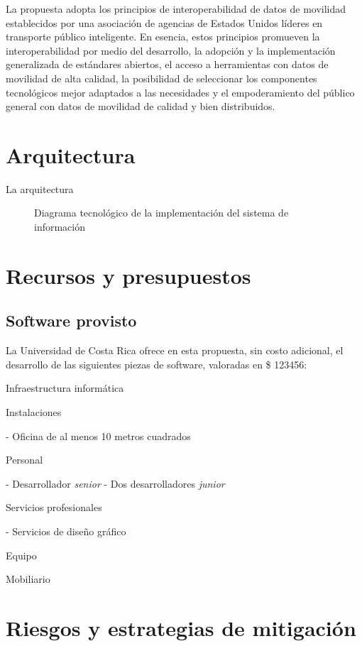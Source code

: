 \documentclass{report}
\begin{document}
La propuesta adopta los principios de interoperabilidad de datos de movilidad  \cite{mdip2023modernizing} establecidos por una asociación de agencias de Estados Unidos líderes en transporte público inteligente. En esencia, estos principios promueven la interoperabilidad por medio del desarrollo, la adopción y la implementación generalizada de estándares abiertos, el acceso a herramientas con datos de movilidad de alta calidad, la posibilidad de seleccionar los componentes tecnológicos mejor adaptados a las necesidades y el empoderamiento del público general con datos de movilidad de calidad y bien distribuidos.


\section{Arquitectura}

La arquitectura 

\begin{figure}
\centering

\caption{Diagrama tecnológico de la implementación del sistema de información}
\label{F:arquitectura}
\end{figure}

\section{Recursos y presupuestos}

\subsection{Software provisto}

La Universidad de Costa Rica ofrece en esta propuesta, sin costo adicional, el desarrollo de las siguientes piezas de software, valoradas en \$ 123456:

Infraestructura informática

Instalaciones

- Oficina de al menos 10 metros cuadrados

Personal

- Desarrollador \textit{senior}
- Dos desarrolladores \textit{junior}

Servicios profesionales

- Servicios de diseño gráfico

Equipo

Mobiliario


\section{Riesgos y estrategias de mitigación}
\label{S:riesgos}
\end{document}
